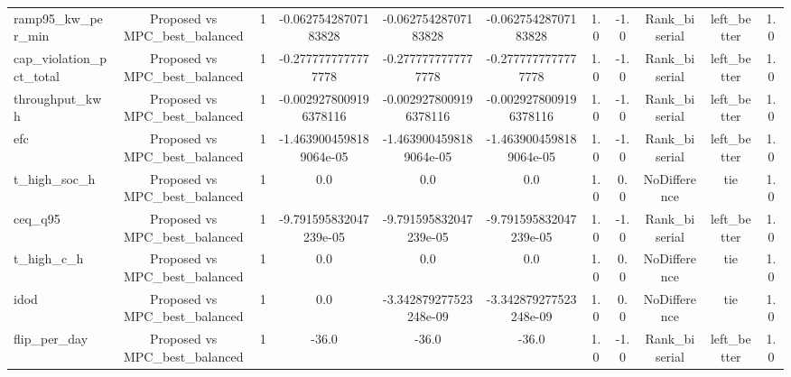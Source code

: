 \begin{table}[t]
\begin{tabular}{lcccccccccc}
ramp95\_kw\_per\_min & Proposed vs MPC\_best\_balanced & 1 & -0.06275428707183828 & -0.06275428707183828 & -0.06275428707183828 & 1.0 & -1.0 & Rank\_biserial & left\_better & 1.0 \\
cap\_violation\_pct\_total & Proposed vs MPC\_best\_balanced & 1 & -0.2777777777777778 & -0.2777777777777778 & -0.2777777777777778 & 1.0 & -1.0 & Rank\_biserial & left\_better & 1.0 \\
throughput\_kwh & Proposed vs MPC\_best\_balanced & 1 & -0.0029278009196378116 & -0.0029278009196378116 & -0.0029278009196378116 & 1.0 & -1.0 & Rank\_biserial & left\_better & 1.0 \\
efc & Proposed vs MPC\_best\_balanced & 1 & -1.4639004598189064e-05 & -1.4639004598189064e-05 & -1.4639004598189064e-05 & 1.0 & -1.0 & Rank\_biserial & left\_better & 1.0 \\
t\_high\_soc\_h & Proposed vs MPC\_best\_balanced & 1 & 0.0 & 0.0 & 0.0 & 1.0 & 0.0 & NoDifference & tie & 1.0 \\
ceq\_q95 & Proposed vs MPC\_best\_balanced & 1 & -9.791595832047239e-05 & -9.791595832047239e-05 & -9.791595832047239e-05 & 1.0 & -1.0 & Rank\_biserial & left\_better & 1.0 \\
t\_high\_c\_h & Proposed vs MPC\_best\_balanced & 1 & 0.0 & 0.0 & 0.0 & 1.0 & 0.0 & NoDifference & tie & 1.0 \\
idod & Proposed vs MPC\_best\_balanced & 1 & 0.0 & -3.342879277523248e-09 & -3.342879277523248e-09 & 1.0 & 0.0 & NoDifference & tie & 1.0 \\
flip\_per\_day & Proposed vs MPC\_best\_balanced & 1 & -36.0 & -36.0 & -36.0 & 1.0 & -1.0 & Rank\_biserial & left\_better & 1.0 \\
\bottomrule
\end{tabular}
\end{table}